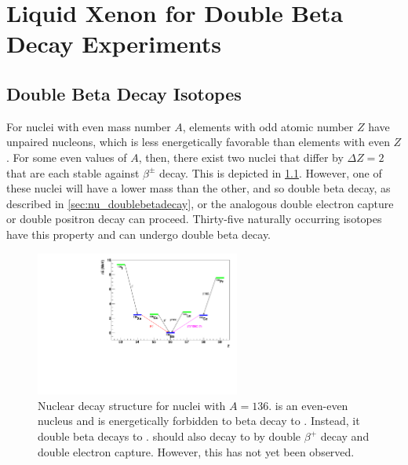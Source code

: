 \documentclass[herrin-thesis.tex]{subfiles}
\begin{document}
\chapter[Liquid Xenon for Double Beta Decay Experiments]{Liquid Xenon for Double Beta Decay Experiments}
\label{ch:liquidxe}

\section{Double Beta Decay Isotopes}
For nuclei with even mass number \(A\), elements with odd atomic number \(Z\) have unpaired nucleons, which is less energetically favorable than elements with even \(Z\). For some even values of \(A\), then, there exist two nuclei that differ by \(\Delta Z = 2\) that are each stable against \(\beta^{\pm}\) decay. This is depicted in \cref{fig:xe_nuclei_masses}. However, one of these nuclei will have a lower mass than the other, and so double beta decay, as described in \cref{sec:nu_doublebetadecay}, or the analogous double electron capture or double positron decay can proceed. Thirty-five naturally occurring isotopes have this property and can undergo double beta decay.

\begin{figure}[htp]
\centering
\includegraphics[width=0.6\textwidth]{./plots/xe_nuclei_masses.pdf}
\caption[Nuclear decay structure for \(A=136\)]{Nuclear decay structure for nuclei with \(A=136\).  is an even-even nucleus and is energetically forbidden to beta decay to . Instead, it double beta decays to .  should also decay to  by double \(\beta^{+}\) decay and double electron capture. However, this has not yet been observed.}
\label{fig:xe_nuclei_masses}
\end{figure}
\end{document}
